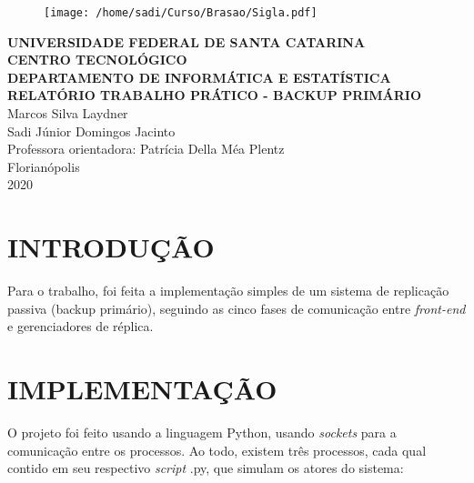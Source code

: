 \documentclass[12pt,a4paper]{article}
\begin{document}
	\singlespacing
	\begin{titlepage}
		\begin{center}
			\begin{figure}[!htb]
				\center
				\texttt{[image: /home/sadi/Curso/Brasao/Sigla.pdf]} 
			\end{figure}
			{\bf UNIVERSIDADE FEDERAL DE SANTA CATARINA}\\[0.2cm]
			{\bf CENTRO TECNOLÓGICO}\\[0.2cm]
			{\bf DEPARTAMENTO DE INFORMÁTICA E ESTATÍSTICA}\\[5.5cm]
			{\bf \large RELATÓRIO TRABALHO PRÁTICO - BACKUP PRIMÁRIO}\\[3.6 cm]
			{Marcos Silva Laydner}\\	
			{Sadi Júnior Domingos Jacinto}\\[1cm]
			{Professora orientadora: Patrícia Della Méa Plentz}\\[4.1 cm]
			{Florianópolis}\\[0.2cm]
			{2020}
		\end{center}
	\end{titlepage}
\newpage
	
	\section{\normalsize INTRODUÇÃO}
		Para o trabalho, foi feita a implementação simples de um sistema de replicação passiva (backup primário), seguindo as cinco fases de comunicação entre \textit{front-end} e gerenciadores de réplica.
		
	\section{\normalsize IMPLEMENTAÇÃO}
		O projeto foi feito usando a linguagem Python, usando \textit{sockets} para a comunicação entre os processos. Ao todo, existem três processos, cada qual contido em seu respectivo \textit{script} .py, que simulam os atores do sistema:
		
\end{document}
